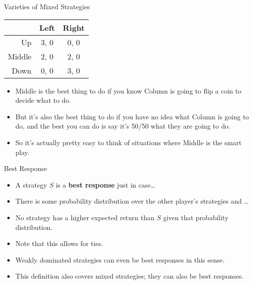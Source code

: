 \documentclass[
  ignorenonframetext,
]{beamer}
\providecommand{\tightlist}{%
  \setlength{\itemsep}{0pt}\setlength{\parskip}{0pt}}
\begin{document}
\begin{frame}{Varieties of Mixed Strategies}
\protect\hypertarget{varieties-of-mixed-strategies}{}
\begin{table}[!h]
\centering
\begin{tabular}[t]{>{}r|cc}
\toprule
 & Left & Right\\
\midrule
Up & 3, 0 & 0, 0\\
Middle & 2, 0 & 2, 0\\
Down & 0, 0 & 3, 0\\
\bottomrule
\end{tabular}
\end{table}

\begin{itemize}
\tightlist
\item
  Middle is the best thing to do if you know Column is going to flip a
  coin to decide what to do. \pause
\item
  But it's also the best thing to do if you have no idea what Column is
  going to do, and the best you can do is say it's 50/50 what they are
  going to do.
\item
  So it's actually pretty easy to think of situations where Middle is
  the smart play.
\end{itemize}
\end{frame}

\begin{frame}{Best Response}
\protect\hypertarget{best-response}{}
\begin{itemize}
\tightlist
\item
  A strategy \(S\) is a \textbf{best response} just in case\ldots{}
\item
  There is some probability distribution over the other player's
  strategies and \ldots{}
\item
  No strategy has a higher expected return than \(S\) given that
  probability distribution. \pause
\item
  Note that this allows for ties.
\item
  Weakly dominated strategies can even be best responses in this sense.
  \pause
\item
  This definition also covers mixed strategies; they can also be best
  responses.
\end{itemize}
\end{frame}
\end{document}
